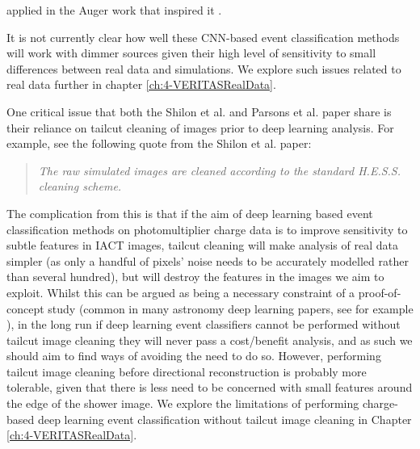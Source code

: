 applied in the Auger work that inspired it \cite{ErdmannAuger}.

It is not currently clear how well these CNN-based event classification methods will work with dimmer sources given their high level of sensitivity to small differences between real data and simulations. We explore such issues related to real data further in chapter \ref{ch:4-VERITASRealData}.

One critical issue that both the Shilon et al. and Parsons et al. paper share is their reliance on tailcut cleaning of images prior to deep learning analysis. For example, see the following quote from the Shilon et al. paper:
\begin{quote}
    \textit{The raw simulated images are cleaned according to the standard H.E.S.S. cleaning scheme.}
\end{quote}

The complication from this is that if the aim of deep learning based event classification methods on photomultiplier charge data is to improve sensitivity to subtle features in IACT images, tailcut cleaning will make analysis of real data simpler (as only a handful of pixels' noise needs to be accurately modelled rather than several hundred), but will destroy the features in the images we aim to exploit. Whilst this can be argued as being a necessary constraint of a proof-of-concept study (common in many astronomy deep learning papers, see for example \cite{dodgygal}), in the long run if deep learning event classifiers cannot be performed without tailcut image cleaning they will never pass a cost/benefit analysis, and as such we should aim to find ways of avoiding the need to do so. However, performing tailcut image cleaning before directional reconstruction is probably more tolerable, given that there is less need to be concerned with small features around the edge of the shower image. We explore the limitations of performing charge-based deep learning event classification without tailcut image cleaning in Chapter \ref{ch:4-VERITASRealData}.  

